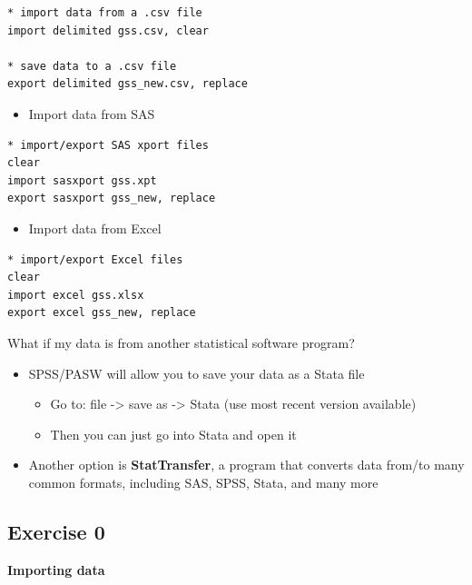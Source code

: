 \documentclass[]{book}
\providecommand{\tightlist}{%
  \setlength{\itemsep}{0pt}\setlength{\parskip}{0pt}}
\begin{document}
\begin{verbatim}
* import data from a .csv file
import delimited gss.csv, clear

* save data to a .csv file
export delimited gss_new.csv, replace
\end{verbatim}

\begin{itemize}
\tightlist
\item
  Import data from SAS
\end{itemize}

\begin{verbatim}
* import/export SAS xport files
clear
import sasxport gss.xpt
export sasxport gss_new, replace
\end{verbatim}

\begin{itemize}
\tightlist
\item
  Import data from Excel
\end{itemize}

\begin{verbatim}
* import/export Excel files
clear
import excel gss.xlsx
export excel gss_new, replace
\end{verbatim}

What if my data is from another statistical software program?

\begin{itemize}
\tightlist
\item
  SPSS/PASW will allow you to save your data as a Stata file

  \begin{itemize}
  \tightlist
  \item
    Go to: file -\textgreater{} save as -\textgreater{} Stata (use most
    recent version available)
  \item
    Then you can just go into Stata and open it
  \end{itemize}
\item
  Another option is \textbf{StatTransfer}, a program that converts data
  from/to many common formats, including SAS, SPSS, Stata, and many more
\end{itemize}

\subsection{Exercise 0}\label{exercise-0-5}

\textbf{Importing data}
\end{document}
